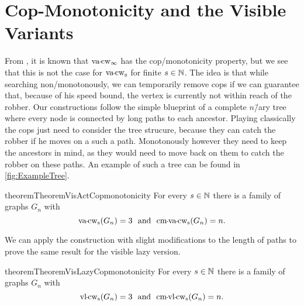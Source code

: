 \section{Cop-Monotonicity and the Visible Variants}
From \cite{seymour1993graph}, it is known that $\vacopwidth{\infty}$ has the cop\-/monotonicity property, but we see that this is not the case for $\vacopwidth{s}$ for finite $s \in \mathbb{N}$. The idea is that while searching non\-/monotonously, we can temporarily remove cops if we can guarantee that, because of his speed bound, the vertex is currently not within reach of the robber. Our constructions follow the simple blueprint of a complete $n$\=/ary tree where every node is connected by long paths to each ancestor. Playing classically the cops just need to consider the tree strucure, because they can catch the robber if he moves on a such a path. Monotonously however they need to keep the ancestors in mind, as they would need to move back on them to catch the robber on these paths. An example of such a tree can be found in \cref{fig:ExampleTree}.


\begin{restatable}{theorem}{TheoremVisActCopmonotonicity}
For every $s\in\mathbb{N}$ there is a family of graphs $G_n$ with $$\vacopwidth{s}(G_n)=3 \ \ \text{and} \ \ \cmvacopwidth{s}(G_n)=n.$$
\end{restatable}
We can apply the construction with slight modifications to the length of paths to prove the same result for the visible lazy version.
\begin{restatable}{theorem}{TheoremVisLazyCopmonotonicity}
 For every $s\in \mathbb{N}$ there is a family of graphs $G_n$ with $$\vlcopwidth{s}(G_n)=3 \ \ \text{and} \ \ \cmvlcopwidth{s}(G_n)=n.$$
\end{restatable}